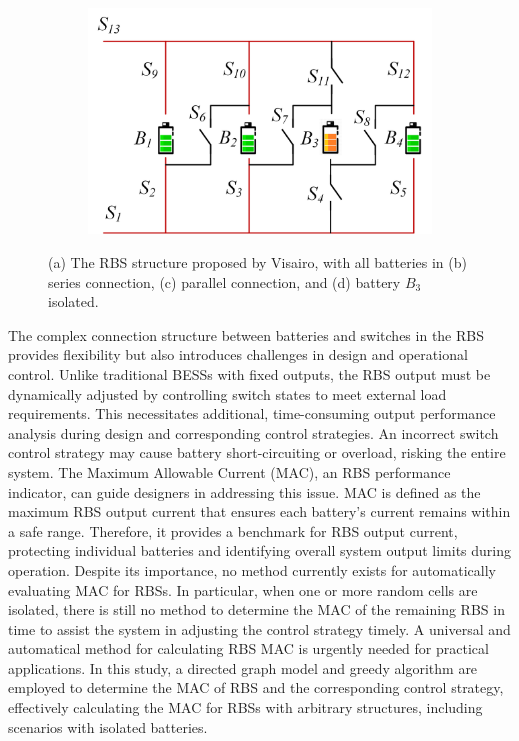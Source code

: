\documentclass{article}
\begin{document}
\begin{figure}[htbp]
\begin{subfigure}[b]{0.45\textwidth}
        \caption{}
        \label{fig:stru-Visairo-parallel}
    \end{subfigure}
    \hspace{0.05\textwidth}
    \begin{subfigure}[b]{0.45\textwidth}
        \includegraphics[width=\textwidth]{stru-V-isolate.png}
        \caption{}
        \label{fig:stru-Visairo-isolate}
    \end{subfigure}
    \caption{
        (a) The RBS structure proposed by Visairo\cite{visairoReconfigurableBatteryPack2008}, with
        all batteries in (b) series connection, (c) parallel connection, and
        (d) battery $B_3$ isolated.
        }
    \label{fig:arch}
\end{figure}

The complex connection structure between batteries and switches in the RBS provides flexibility but also introduces challenges in design and operational control. 
Unlike traditional BESSs with fixed outputs, the RBS output must be dynamically adjusted by controlling switch states to meet external load requirements. 
This necessitates additional, time-consuming output performance analysis during design and corresponding control strategies. 
An incorrect switch control strategy may cause battery short-circuiting or overload, risking the entire system. 
The Maximum Allowable Current (MAC), an RBS performance indicator, can guide designers in addressing this issue. 
MAC is defined as the maximum RBS output current that ensures each battery's current remains within a safe range.
Therefore, it provides a benchmark for RBS output current, protecting individual batteries and identifying overall system output limits during operation. 
Despite its importance, no method currently exists for automatically evaluating MAC for RBSs.
In particular, when one or more random cells are isolated, there is still no method to determine the MAC of the remaining RBS in time to assist the system in adjusting the control strategy timely. 
A universal and automatical method for calculating RBS MAC is urgently needed for practical applications. 
In this study, a directed graph model and greedy algorithm are employed to determine the MAC of RBS and the corresponding control strategy, effectively calculating the MAC for RBSs with arbitrary structures, including scenarios with isolated batteries.
\end{document}
